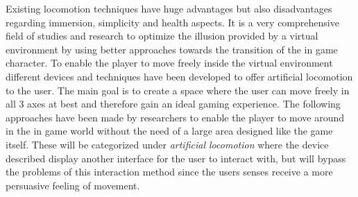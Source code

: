 Existing locomotion techniques have huge advantages but also disadvantages regarding immersion, simplicity and health aspects. It is a very comprehensive field of studies and research to optimize the illusion provided by a virtual environment by using better approaches towards the transition of the in game character.\newline
To enable the player to move freely inside the virtual environment different devices and techniques have been developed to offer artificial locomotion to the user. The main goal is to create a space where the user can move freely in all 3 axes at best and therefore gain an ideal gaming experience.\newline
The following approaches have been made by researchers to enable the player to move around in the in game world without the need of a large area designed like the game itself. These will be categorized under \textit{artificial locomotion} where the device described display another interface for the user to interact with, but will bypass the problems of this interaction method since the users senses receive a more persuasive feeling of movement.
